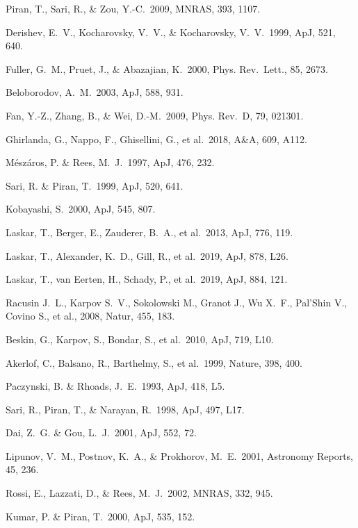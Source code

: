 \documentclass{naturesubmissionstyle}
\newcommand\aap{A\&A}                %
\newcommand\apj{ApJ}                 %
\newcommand\apjl{ApJ}                %
\newcommand\mnras{MNRAS}             %
\newcommand\nat{Nature}              %
\newcommand\prd{Phys. Rev.~D}        %
\newcommand\prl{Phys. Rev.~Lett.}    %
\begin{document}
\begin{thebibliography}{10}
 Piran, T., Sari, R., \& Zou, Y.-C.\ 2009, \mnras, 393, 1107. 

 Derishev, E.~V., Kocharovsky, V.~V., \& Kocharovsky, V.~V.\ 1999, \apj, 521, 640. 

 Fuller, G.~M., Pruet, J., \& Abazajian, K.\ 2000, \prl, 85, 2673. 

 Beloborodov, A.~M.\ 2003, \apj, 588, 931. 

 Fan, Y.-Z., Zhang, B., \& Wei, D.-M.\ 2009, \prd, 79, 021301. 

 Ghirlanda, G., Nappo, F., Ghisellini, G., et al.\ 2018, \aap, 609, A112. 

 M{\'e}sz{\'a}ros, P. \& Rees, M.~J.\ 1997, \apj, 476, 232. 

 Sari, R. \& Piran, T.\ 1999, \apj, 520, 641. 

 Kobayashi, S.\ 2000, \apj, 545, 807. 

 Laskar, T., Berger, E., Zauderer, B.~A., et al.\ 2013, \apj, 776, 119. 

 Laskar, T., Alexander, K.~D., Gill, R., et al.\ 2019, \apjl, 878, L26. 

 Laskar, T., van Eerten, H., Schady, P., et al.\ 2019, \apj, 884, 121. 

 Racusin J.~L., Karpov S.~V., Sokolowski M., Granot J., Wu X.~F., Pal'Shin V., Covino S., et al., 2008, Natur, 455, 183. 

 Beskin, G., Karpov, S., Bondar, S., et al.\ 2010, \apjl, 719, L10. 

 Akerlof, C., Balsano, R., Barthelmy, S., et al.\ 1999, \nat, 398, 400. 


 Paczynski, B. \& Rhoads, J.~E.\ 1993, \apjl, 418, L5. 


 Sari, R., Piran, T., \& Narayan, R.\ 1998, \apjl, 497, L17. 

 Dai, Z.~G. \& Gou, L.~J.\ 2001, \apj, 552, 72. 

 Lipunov, V.~M., Postnov, K.~A., \& Prokhorov, M.~E.\ 2001, Astronomy Reports, 45, 236. 

 Rossi, E., Lazzati, D., \& Rees, M.~J.\ 2002, \mnras, 332, 945. 

 Kumar, P. \& Piran, T.\ 2000, \apj, 535, 152. 


\end{thebibliography}
\end{document}
